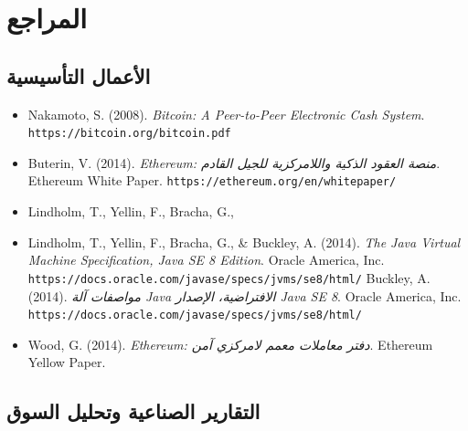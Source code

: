 \documentclass[11pt]{article}
\begin{document}
\clearpage

\section*{المراجع}

\subsection*{الأعمال التأسيسية}

\begin{itemize}[leftmargin=*, label={}]
  \item Nakamoto, S. (2008). \textit{Bitcoin: A Peer-to-Peer Electronic Cash System}. \texttt{https://bitcoin.org/bitcoin.pdf}

  \item Buterin, V. (2014). \textit{Ethereum: منصة العقود الذكية واللامركزية للجيل القادم}. Ethereum White Paper. \texttt{https://ethereum.org/en/whitepaper/}

  \item Lindholm, T., Yellin, F., Bracha, G., \  \item Lindholm, T., Yellin, F., Bracha, G., \& Buckley, A. (2014). \textit{The Java Virtual Machine Specification, Java SE 8 Edition}. Oracle America, Inc. \texttt{https://docs.oracle.com/javase/specs/jvms/se8/html/} Buckley, A. (2014). \textit{مواصفات آلة Java الافتراضية، الإصدار Java SE 8}. Oracle America, Inc. \texttt{https://docs.oracle.com/javase/specs/jvms/se8/html/}

  \item Wood, G. (2014). \textit{Ethereum: دفتر معاملات معمم لامركزي آمن}. Ethereum Yellow Paper.
\end{itemize}

\subsection*{التقارير الصناعية وتحليل السوق}
\end{document}
